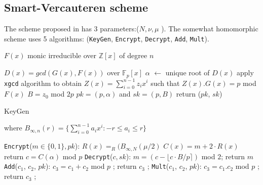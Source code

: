 \documentclass{acm_proc_article-sp}
\begin{document}
\subsection{Smart-Vercauteren  scheme}

The scheme proposed in \cite{cryptoeprint:2009:571} has 3 parameters:($N, \nu, \mu$ ). The somewhat homomorphic scheme uses 5 algorithms: (\texttt{KeyGen}, \texttt{Encrypt}, \texttt{Decrypt}, \texttt{Add}, \texttt{Mult}).

\linesnumbered
\begin{algorithm}[H]
 \SetVline
 $F(x)$ monic irreducible over $\mathbb{Z}[x]$ of degree $n$\;

$D(x)=gcd(G(x),F(x))$ over $\mathbb{F}_p[x]$\;
$\alpha$ $\leftarrow$ unique root of $D(x)$\;
apply \texttt{xgcd} algorithm to obtain $Z(x) = \sum_{i=0}^{n-1}{z_ix^i} $  such that $Z(x).G(x)=p$ mod $F(x)$\;
$B=z_0$ mod $2p$\;
$pk = (p, \alpha)$ and $sk = (p , B)$\;
return ($pk$, $sk$)\;
\caption{KeyGen\label{Code:SV}}
\end{algorithm}

where $ B_{\infty , n}(r) = \{\sum_{i=0}^{n-1}{a_i}x^i : -r \leq a_i \leq r \} $

\texttt{Encrypt}($m \in \{0,1\} , pk$): 
\newline \phantom{x}\hspace{3ex}  $R(x)=_{R}(B_{\infty , N}(\mu/2)$
 \; $C(x)=m+2\cdot R(x)$ 
\newline \phantom{x}\hspace{3ex} return  $c=C(\alpha)$ mod $p$
\newline \texttt{Decrypt}($c, sk$):
\newline \phantom{x}\hspace{3ex} $m = (c - \lfloor c \cdot B/p \rceil )$ mod $2$;
\phantom{x}\hspace{1ex} return $m$
\newline \texttt{Add}($c_1$, $c_2$, $pk$):
\newline \phantom{x}\hspace{3ex} $c_3=c_1+c_2$ mod $p$
;  \phantom{x}\hspace{1ex}  return $c_3$
;
\newline \texttt{Mult}($c_1$, $c_2$, $pk$):
 \newline \phantom{x}\hspace{3ex}  $c_3=c_1.c_2$ mod $p$
 ; \phantom{x}\hspace{1ex}  return $c_3$
;
\end{document}
